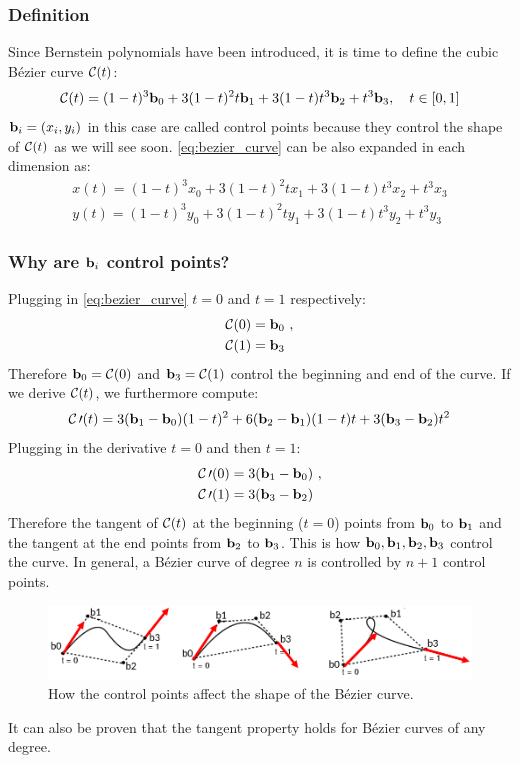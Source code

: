 \documentclass[a4paper]{article}
\begin{document}
\subsubsection{Definition}
Since Bernstein polynomials have been introduced, it is time to define the cubic B\'ezier curve $\mathcal{C}(t)$:
\begin{equation}
    \mathcal{C}(t) = (1-t)^3\textbf{b}_0 + 3(1-t)^2t\textbf{b}_1 + 3(1-t)t^3\textbf{b}_2 + t^3\textbf{b}_3, \quad t\in[0,1]
    \label{eq:bezier_curve}
\end{equation}
$\textbf{b}_i = (x_i, y_i)$ in this case are called control points because they control the shape of $\mathcal{C}(t)$ as we will see soon. \eqref{eq:bezier_curve} can be also expanded in each dimension as:
\begin{align*}
    x(t) = (1-t)^3x_0 + 3(1-t)^2tx_1 + 3(1-t)t^3x_2 + t^3x_3\\
    y(t) = (1-t)^3y_0 + 3(1-t)^2ty_1 + 3(1-t)t^3y_2 + t^3y_3
\end{align*}



\subsubsection{Why are $\textbf{b}_i$ control points?}
Plugging in \eqref{eq:bezier_curve} $t=0$ and $t=1$ respectively:
\begin{align*}
    \mathcal{C}(0) &= \textbf{b}_0\ ,\\
    \mathcal{C}(1) &= \textbf{b}_3
\end{align*}
Therefore $\textbf{b}_0 = \mathcal{C}(0)$ and $\textbf{b}_3 = \mathcal{C}(1)$ control the beginning and end of the curve. If we derive $\mathcal{C}(t)$, we furthermore compute:
\[
    \mathcal{C}\prime(t) = 3(\textbf{b}_1-\textbf{b}_0)(1-t)^2 + 6(\textbf{b}_2-\textbf{b}_1)(1-t)t + 3(\textbf{b}_3-\textbf{b}_2)t^2
\]
Plugging in the derivative $t=0$ and then $t=1$:
\begin{align*}
    \mathcal{C}\prime(0) &= 3(\textbf{b}_1-\textbf{b}_0)\ ,\\
    \mathcal{C}\prime(1) &= 3(\textbf{b}_3-\textbf{b}_2)
\end{align*}
Therefore the tangent of $\mathcal{C}(t)$ at the beginning ($t=0$) points from $\textbf{b}_0$ to $\textbf{b}_1$ and the tangent at the end points from $\textbf{b}_2$ to $\textbf{b}_3$. This is how $\textbf{b}_0, \textbf{b}_1, \textbf{b}_2, \textbf{b}_3$ control the curve. In general, a B\'ezier curve of degree $n$ is controlled by $n+1$ control points.
\begin{figure}[H]
    \centering
    \includegraphics[width=0.8\linewidth]{img/bezier/tangents_control_points.png}
    \caption{How the control points affect the shape of the B\'ezier curve.}%
\end{figure}
It can also be proven that the tangent property holds for B\'ezier curves of any degree.
\end{document}
